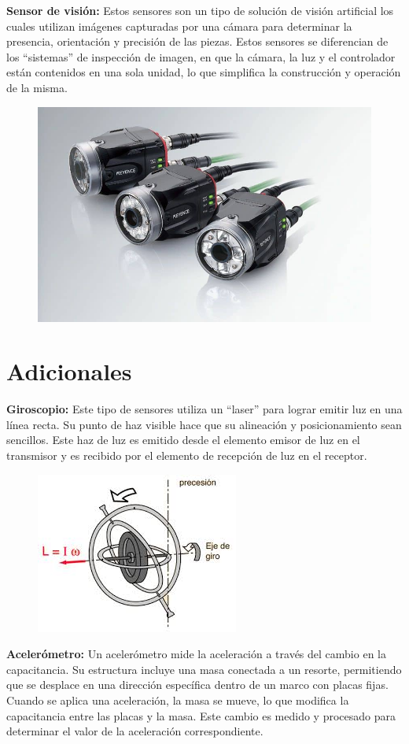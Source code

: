 \textbf{Sensor de visión: }
Estos sensores son un tipo de solución de visión artificial los cuales utilizan imágenes capturadas por una cámara para determinar la presencia, orientación y  precisión de las piezas. Estos sensores se diferencian de los “sistemas” de inspección de imagen, en que la cámara, la luz y el controlador están contenidos en una sola unidad, lo que simplifica la construcción y operación de la misma.

\begin{figure}[h]
	\centering
	\includegraphics[width=0.4\linewidth, height=0.2\textwidth]{img/vision}
	\caption{}
	\label{fig:vision}
\end{figure} 

\section{Adicionales}
\textbf{Giroscopio:}
Este tipo de sensores utiliza un “laser” para lograr emitir luz en una línea recta. Su punto de haz visible hace que su alineación y posicionamiento sean sencillos. Este haz de luz es emitido desde el elemento emisor de luz en el transmisor y es recibido por el elemento de recepción de luz en el receptor. 
\vspace{10mm}  %

\begin{figure}[h]
	\centering
	\includegraphics[width=0.3\linewidth, height=0.23\textheight]{img/giros}
	\caption{}
	\label{fig:giros}
\end{figure}


\textbf{Acelerómetro:}
Un acelerómetro mide la aceleración a través del cambio en la capacitancia. Su estructura incluye una masa conectada a un resorte, permitiendo que se desplace en una dirección específica dentro de un marco con placas fijas. Cuando se aplica una aceleración, la masa se mueve, lo que modifica la capacitancia entre las placas y la masa. Este cambio es medido y procesado para determinar el valor de la aceleración correspondiente.
\vspace{10pt}  %


